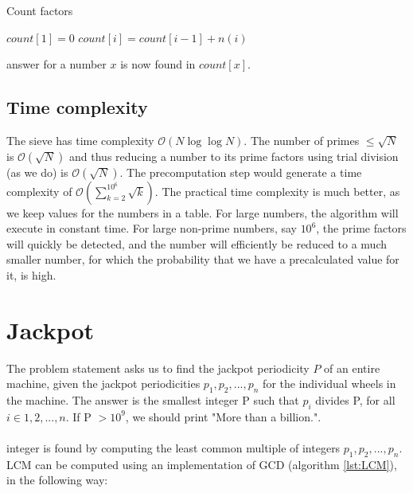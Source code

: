 \documentclass[11pt,a4paper,twoside]{article}
\begin{document}

\begin{algorithm}
    \caption{Count factors}
    \label{factorcount}
    \begin{algorithmic}
        \STATE $count[1] = 0$
            \STATE $count[i] = count[i-1] + n(i)$
        \ENDFOR
    \end{algorithmic}
\end{algorithm}

 answer for a number $x$ is now found in $count[x]$. 
\subsection{Time complexity}
The sieve has time complexity $\mathcal{O}(N\log{\log{N}})$. The number of primes $\le \sqrt{N}$ is $\mathcal{O}(\sqrt{N})$ and thus reducing a number to its prime factors using trial division (as we do) is $\mathcal{O}(\sqrt{N})$. The precomputation step would generate a time complexity of $\mathcal{O}(\sum_{k=2}^{10^{6}}\sqrt{k})$. The practical time complexity is much better, as we keep values for the numbers in a table. For large numbers, the algorithm will execute in constant time. For large non-prime numbers, say $10^6$, the prime factors will quickly be detected, and the number will efficiently be reduced to a much smaller number, for which the probability that we have a precalculated value for it, is high.

\section{Jackpot}

The problem statement asks us to find the jackpot periodicity $P$ of an entire
machine, given the jackpot periodicities $p_{1},p_{2},...,p_{n}$ for the
individual wheels in the machine. The answer is the smallest integer P such
that $p_{i}$ divides P, for all $i \in {1,2,...,n}$. If P $> 10^{9}$, we should
print "More than a billion.".
\\\\
 integer is found by computing the least common multiple of
integers $p_{1},p_{2},...,p_{n}$. LCM can be computed using an implementation
of GCD (algorithm \ref{lst:LCM}), in the following way:
\end{document}

